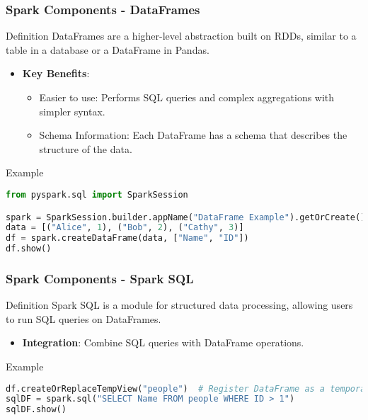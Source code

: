 \documentclass[aspectratio=169]{beamer}
\begin{document}
\begin{frame}[fragile]
    \frametitle{Spark Components - DataFrames}
    \begin{block}{Definition}
        DataFrames are a higher-level abstraction built on RDDs, similar to a table in a database or a DataFrame in Pandas.
    \end{block}
    \begin{itemize}
        \item \textbf{Key Benefits}:
        \begin{itemize}
            \item Easier to use: Performs SQL queries and complex aggregations with simpler syntax.
            \item Schema Information: Each DataFrame has a schema that describes the structure of the data.
        \end{itemize}
    \end{itemize}
    \begin{block}{Example}
        \begin{lstlisting}[language=Python]
from pyspark.sql import SparkSession

spark = SparkSession.builder.appName("DataFrame Example").getOrCreate()
data = [("Alice", 1), ("Bob", 2), ("Cathy", 3)]
df = spark.createDataFrame(data, ["Name", "ID"])
df.show()
        \end{lstlisting}
    \end{block}
\end{frame}

\begin{frame}[fragile]
    \frametitle{Spark Components - Spark SQL}
    \begin{block}{Definition}
        Spark SQL is a module for structured data processing, allowing users to run SQL queries on DataFrames.
    \end{block}
    \begin{itemize}
        \item \textbf{Integration}: Combine SQL queries with DataFrame operations.
    \end{itemize}
    \begin{block}{Example}
        \begin{lstlisting}[language=Python]
df.createOrReplaceTempView("people")  # Register DataFrame as a temporary view
sqlDF = spark.sql("SELECT Name FROM people WHERE ID > 1")
sqlDF.show()
        \end{lstlisting}
    \end{block}
\end{frame}
\end{document}
